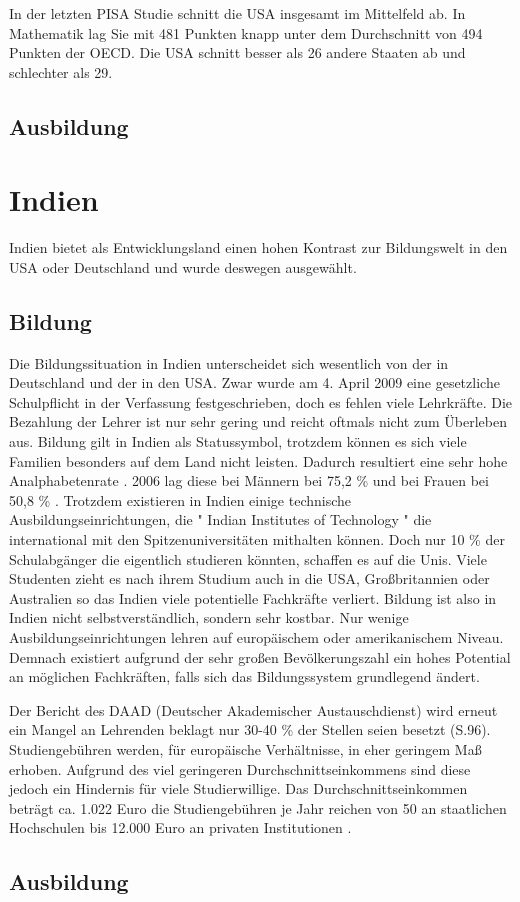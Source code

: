 In der letzten PISA Studie schnitt die USA insgesamt im Mittelfeld ab. In Mathematik lag Sie mit 481 Punkten knapp unter dem Durchschnitt von 494 Punkten der OECD. Die USA schnitt besser als 26 andere Staaten ab und schlechter als 29. \cite{pisa2}

\subsection{Ausbildung}

\section{Indien}
Indien bietet als Entwicklungsland einen hohen Kontrast zur Bildungswelt in den USA oder Deutschland und wurde deswegen ausgewählt.

\subsection{Bildung}
Die Bildungssituation in Indien unterscheidet sich wesentlich von der in Deutschland und der in den USA. Zwar wurde am 4. April 2009 eine gesetzliche Schulpflicht in der Verfassung festgeschrieben, doch es fehlen viele Lehrkräfte. \cite{dw} Die Bezahlung der Lehrer ist nur sehr gering und reicht oftmals nicht zum Überleben aus. Bildung gilt in Indien als Statussymbol, trotzdem können es sich viele Familien besonders auf dem Land nicht leisten. Dadurch resultiert eine sehr hohe Analphabetenrate \cite{analpha}. 2006 lag diese bei Männern bei 75,2 \% und bei Frauen bei 50,8 \% .
Trotzdem existieren in Indien einige technische Ausbildungseinrichtungen, die " Indian Institutes of Technology " die international mit den Spitzenuniversitäten mithalten können. Doch nur 10 \% der Schulabgänger die eigentlich studieren könnten, schaffen es auf die Unis. Viele Studenten zieht es nach ihrem Studium auch in die USA, Großbritannien oder Australien so das Indien viele potentielle Fachkräfte verliert.
Bildung ist also in Indien nicht selbstverständlich, sondern sehr kostbar. Nur wenige Ausbildungseinrichtungen lehren auf europäischem oder amerikanischem Niveau. Demnach existiert aufgrund der sehr großen Bevölkerungszahl ein hohes Potential an möglichen Fachkräften, falls sich das Bildungssystem grundlegend ändert.

Der Bericht des DAAD (Deutscher Akademischer Austauschdienst) \cite{daad} wird erneut ein Mangel an Lehrenden beklagt nur 30-40 \% der Stellen seien besetzt (S.96).
Studiengebühren werden, für europäische Verhältnisse, in eher geringem Maß erhoben. Aufgrund des viel geringeren Durchschnittseinkommens sind diese jedoch ein Hindernis für viele Studierwillige. Das Durchschnittseinkommen beträgt ca. 1.022 Euro \cite{ausa} die Studiengebühren je Jahr reichen von 50 an staatlichen Hochschulen bis 12.000 Euro an privaten Institutionen \cite[101]{daad}.


\subsection{Ausbildung}








